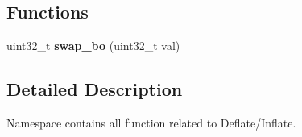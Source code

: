 \subsection*{Functions}
\begin{DoxyCompactItemize}
\item 
\mbox{\label{namespaceeka2l1_1_1flate_aa8fc6614d2a440307bd747ba2173caa7}} 
uint32\+\_\+t {\bfseries swap\+\_\+bo} (uint32\+\_\+t val)
\end{DoxyCompactItemize}


\subsection{Detailed Description}
Namespace contains all function related to Deflate/\+Inflate. 